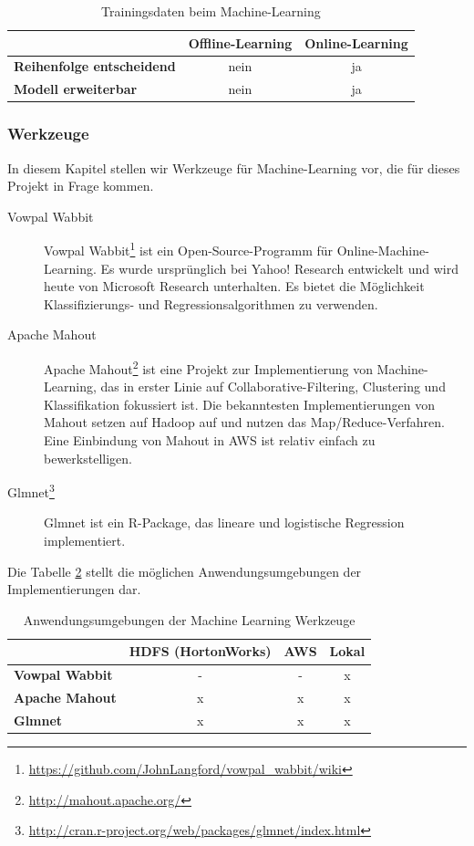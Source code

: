 \begin{table}[H]
	\centering
\begin{tabular}{l|c|c} 
	\textbf{} & \textbf{Offline-Learning} & \textbf{Online-Learning}  \\  
	\hline \textbf{Reihenfolge entscheidend} & nein & ja \\
	\hline \textbf{Modell erweiterbar} & nein & ja 
	\vspace{0.3cm} 
\end{tabular} 
\caption{Trainingsdaten beim Machine-Learning}
\label{tab:MachineLearningTrainingData}
\end{table}
 
\subsubsection{Werkzeuge}
In diesem Kapitel stellen wir Werkzeuge für Machine-Learning vor, die für dieses Projekt in Frage kommen.

\begin{description}
\item[Vowpal Wabbit] Vowpal Wabbit\footnote{\url{https://github.com/JohnLangford/vowpal_wabbit/wiki}} ist ein Open-Source-Programm für Online-Machine-Learning. Es wurde ursprünglich bei Yahoo! Research entwickelt und wird heute von Microsoft Research unterhalten. Es bietet die Möglichkeit Klassifizierungs- und Regressionsalgorithmen zu verwenden.

\item[Apache Mahout] Apache Mahout\footnote{\url{http://mahout.apache.org/}} ist eine Projekt zur Implementierung von Machine-Learning, das in erster Linie auf Collaborative-Filtering, Clustering und Klassifikation fokussiert ist. Die bekanntesten Implementierungen von Mahout setzen auf Hadoop auf und nutzen das Map/Reduce-Verfahren. Eine Einbindung von Mahout in AWS ist relativ einfach zu bewerkstelligen.

\item[Glmnet\footnote{\url{http://cran.r-project.org/web/packages/glmnet/index.html}}] Glmnet ist ein R-Package, das lineare und logistische Regression implementiert.
\end{description}

Die Tabelle \ref{tab:MachineLearningTools} stellt die möglichen Anwendungsumgebungen der Implementierungen dar.

\begin{table}[H]
	\centering
\begin{tabular}{l|c|c|c} 
	\textbf{} & \textbf{HDFS (HortonWorks)} & \textbf{AWS} & \textbf{Lokal}  \\  
	\hline \textbf{Vowpal Wabbit} & - & - & x \\
	\hline \textbf{Apache Mahout} & x & x & x \\
	\hline \textbf{Glmnet} & x & x & x 
	\vspace{0.3cm} 
\end{tabular} 
\caption{Anwendungsumgebungen der Machine Learning Werkzeuge}
\label{tab:MachineLearningTools}
\end{table}


